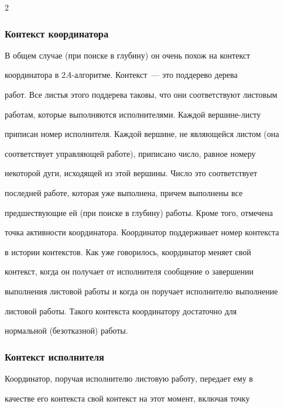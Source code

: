 \begin{multicols}{2}
\subsubsection{Контекст координатора}


      


      В общем случае (при поиске в глубину) он очень похож на контекст 


координатора в $2A$-ал\-го\-рит\-ме. Контекст~--- это поддерево дерева 


работ. Все \mbox{листья} этого поддерева таковы, что они соответствуют лис\-то\-вым 


работам, которые выполняются исполнителями. Каждой вер\-ши\-не-лис\-ту 


приписан номер исполнителя. Каждой вершине, не являющейся листом (она 


соответствует управляющей работе), приписано число, равное номеру 


некоторой дуги, исходящей из этой вершины. Число это соответствует 


последней работе, которая уже выполнена, причем выполнены все 


предшествующие ей (при поиске в глубину) работы. Кроме того, отмечена 


точка активности координатора. Координатор поддерживает номер контекста 


в истории контекстов. Как уже говорилось, координатор меняет свой 


контекст, когда он получает от исполнителя сообщение о завершении 


выполнения листовой работы и когда он поручает исполнителю выполнение 


листовой работы. Такого контекста координатору достаточно для 


нормальной (безотказной) работы. 





\subsubsection{Контекст исполнителя}


      


      Координатор, поручая исполнителю листовую работу, передает ему в 


качестве его контекста свой контекст на этот момент, включая точку 



\end{multicols}
